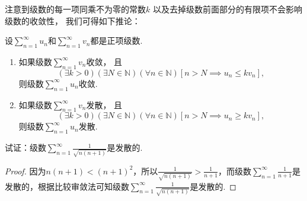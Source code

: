 注意到级数的每一项同乘不为零的常数\(k\)
以及去掉级数前面部分的有限项不会影响级数的收敛性，
我们可得如下推论：
\begin{corollary}\label{theorem:无穷级数.正项级数的比较审敛法的推论}
设\(\sum\limits_{n=1}^\infty u_n\)和\(\sum\limits_{n=1}^\infty v_n\)都是正项级数.
\begin{enumerate}
	\item 如果级数\(\sum\limits_{n=1}^\infty v_n\)收敛，
	且\[
		(\exists k>0)
		(\exists N\in\mathbb{N})
		(\forall n\in\mathbb{N})
		[
			n > N
			\implies
			u_n \leq k v_n
		],
	\]
	则级数\(\sum\limits_{n=1}^\infty u_n\)收敛.

	\item 如果级数\(\sum\limits_{n=1}^\infty v_n\)发散，
	且\[
		(\exists k>0)
		(\exists N\in\mathbb{N})
		(\forall n\in\mathbb{N})
		[
			n > N
			\implies
			u_n \geq k v_n
		],
	\]
	则级数\(\sum\limits_{n=1}^\infty u_n\)发散.
\end{enumerate}
\end{corollary}

\begin{example}
试证：级数\(\sum\limits_{n=1}^\infty \frac{1}{\sqrt{n(n+1)}}\)是发散的.
\begin{proof}
因为\(n(n+1) < (n+1)^2\)，所以\(\frac{1}{\sqrt{n(n+1)}} > \frac{1}{n+1}\)，而级数\(\sum\limits_{n=1}^\infty \frac{1}{n+1}\)是发散的，根据比较审敛法可知级数\(\sum\limits_{n=1}^\infty \frac{1}{\sqrt{n(n+1)}}\)是发散的.
\end{proof}
\end{example}

